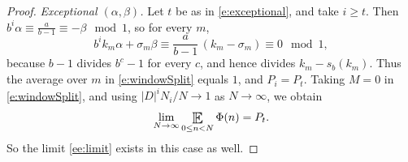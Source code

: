 \begin{proof}
\smallskip 
\noindent\emph{Exceptional $(\alpha,\beta)$.} 
Let $t$ be as in \eqref{e:exceptional}, and take $i\geq t$. 
Then $b^i\alpha\equiv\frac{a}{b-1}\equiv-\beta\mod1$, so for every $m$, 
\begin{equation}
b^ik_m\alpha+\sigma_m\beta\equiv \frac{a}{b-1}\,(k_m-\sigma_m)\equiv 0\mod 1, 
\end{equation}
because $b-1$ divides $b^c-1$ for every $c$, and hence divides $k_m-s_b(k_m)$. 
Thus the average over $m$ in \eqref{e:windowSplit} equals $1$, and $P_i=P_t$. 
Taking $M=0$ in \eqref{e:windowSplit}, and using $\lvert D\rvert^iN_i/N\to1$ as $N\to\infty$, we obtain 
\begin{equation}
\lim_{N\to\infty}\Expectation_{0\leq n<N}\Phi(n)=P_t. 
\end{equation}
So the limit \eqref{ee:limit} exists in this case as well. 
\end{proof} 


